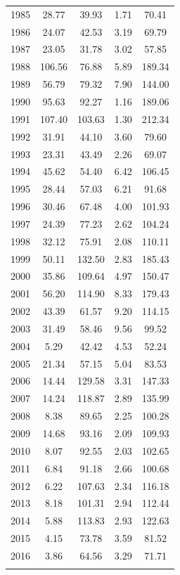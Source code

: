 \documentclass[12pt,]{article}
\begin{document}
\begin{longtable}{ccccc}
  1985 & 28.77 & 39.93 & 1.71 & 70.41 \\ 
  1986 & 24.07 & 42.53 & 3.19 & 69.79 \\ 
  1987 & 23.05 & 31.78 & 3.02 & 57.85 \\ 
  1988 & 106.56 & 76.88 & 5.89 & 189.34 \\ 
  1989 & 56.79 & 79.32 & 7.90 & 144.00 \\ 
  1990 & 95.63 & 92.27 & 1.16 & 189.06 \\ 
  1991 & 107.40 & 103.63 & 1.30 & 212.34 \\ 
  1992 & 31.91 & 44.10 & 3.60 & 79.60 \\ 
  1993 & 23.31 & 43.49 & 2.26 & 69.07 \\ 
  1994 & 45.62 & 54.40 & 6.42 & 106.45 \\ 
  1995 & 28.44 & 57.03 & 6.21 & 91.68 \\ 
  1996 & 30.46 & 67.48 & 4.00 & 101.93 \\ 
  1997 & 24.39 & 77.23 & 2.62 & 104.24 \\ 
  1998 & 32.12 & 75.91 & 2.08 & 110.11 \\ 
  1999 & 50.11 & 132.50 & 2.83 & 185.43 \\ 
  2000 & 35.86 & 109.64 & 4.97 & 150.47 \\ 
  2001 & 56.20 & 114.90 & 8.33 & 179.43 \\ 
  2002 & 43.39 & 61.57 & 9.20 & 114.15 \\ 
  2003 & 31.49 & 58.46 & 9.56 & 99.52 \\ 
  2004 & 5.29 & 42.42 & 4.53 & 52.24 \\ 
  2005 & 21.34 & 57.15 & 5.04 & 83.53 \\ 
  2006 & 14.44 & 129.58 & 3.31 & 147.33 \\ 
  2007 & 14.24 & 118.87 & 2.89 & 135.99 \\ 
  2008 & 8.38 & 89.65 & 2.25 & 100.28 \\ 
  2009 & 14.68 & 93.16 & 2.09 & 109.93 \\ 
  2010 & 8.07 & 92.55 & 2.03 & 102.65 \\ 
  2011 & 6.84 & 91.18 & 2.66 & 100.68 \\ 
  2012 & 6.22 & 107.63 & 2.34 & 116.18 \\ 
  2013 & 8.18 & 101.31 & 2.94 & 112.44 \\ 
  2014 & 5.88 & 113.83 & 2.93 & 122.63 \\ 
  2015 & 4.15 & 73.78 & 3.59 & 81.52 \\ 
  2016 & 3.86 & 64.56 & 3.29 & 71.71 \\ 
   \hline
\hline
\label{tab:Rec_removal}
\end{longtable}
\end{document}
